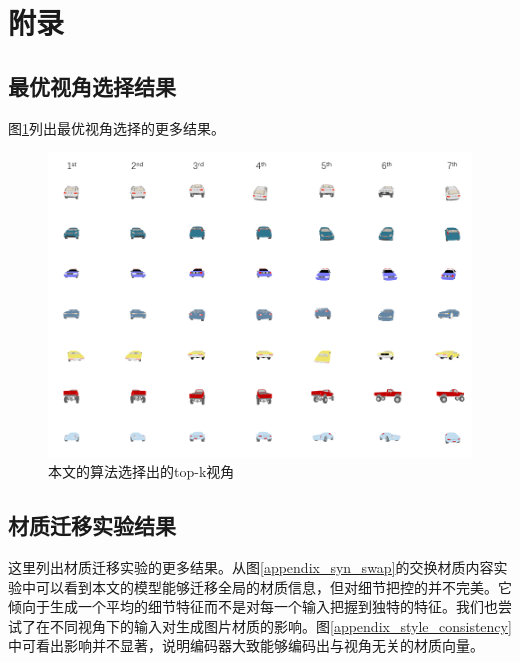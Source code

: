 \documentclass[UTF8,openany,AutoFakeBold,AutoFakeSlant,cs4size]{ctexbook}
\begin{document}


\clearpage


\linespread{1.5}\selectfont
\normalsize
\chapter*{附录}

\section*{最优视角选择结果}

图\ref{appendix_bestview}列出最优视角选择的更多结果。

\begin{figure}
\centering
\includegraphics[width=\linewidth]{./images/bestview_selection.png}
\caption{本文的算法选择出的top-k视角}
\label{appendix_bestview}
\end{figure}

\section*{材质迁移实验结果}

这里列出材质迁移实验的更多结果。从图\ref{appendix_syn_swap}的交换材质内容实验中可以看到本文的模型能够迁移全局的材质信息，但对细节把控的并不完美。它倾向于生成一个平均的细节特征而不是对每一个输入把握到独特的特征。我们也尝试了在不同视角下的输入对生成图片材质的影响。图\ref{appendix_style_consistency}中可看出影响并不显著，说明编码器大致能够编码出与视角无关的材质向量。
\end{document}
